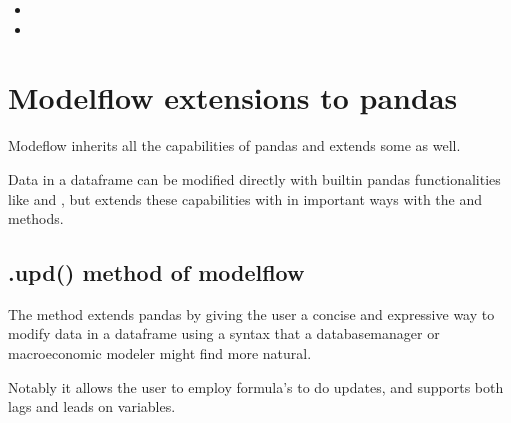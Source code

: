 \documentclass[letterpaper,10pt,english]{jupyterBook}
\begin{document}
\sphinxAtStartPar
{}
\begin{itemize}
\item {} 
\sphinxAtStartPar
{}

\item {} 
\sphinxAtStartPar
{}

\end{itemize}

\sphinxstepscope


\chapter{Modelflow extensions to pandas}
\label{\detokenize{content/04_PythonEssentials/UpdateCommand:modelflow-extensions-to-pandas}}\label{\detokenize{content/04_PythonEssentials/UpdateCommand::doc}}
\sphinxAtStartPar
Modeflow inherits all the capabilities of pandas and extends some as well.

\sphinxAtStartPar
Data in a dataframe can be modified directly with built\sphinxhyphen{}in pandas functionalities like  and , but  extends these capabilities with in important ways with the  and  methods.


\section{.upd() method of modelflow}
\label{\detokenize{content/04_PythonEssentials/UpdateCommand:upd-method-of-modelflow}}
\sphinxAtStartPar
The  method extends pandas by giving the user a concise and expressive way to modify data in a dataframe using a syntax that a database\sphinxhyphen{}manager or macroeconomic modeler might find more natural.

\sphinxAtStartPar
Notably it allows the user to employ formula’s to do updates, and supports both lags and leads on variables.
\end{document}
